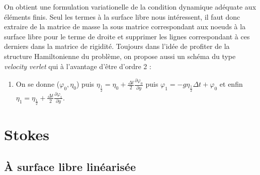 \documentclass{article}
\theoremstyle{plain}
\numberwithin{equation}{section} %
\begin{document}
On obtient une formulation variationelle de la condition dynamique ad\'equate aux \'el\'ements finis. Seul les termes \`a la surface libre nous int\'eressent, il faut donc extraire de la matrice de masse la sous matrice correspondant aux noeuds \`a la surface libre pour le terme de droite et supprimer les lignes correspondant \`a ces derniers dans la matrice de rigidit\'e. Toujours dans l'id\'ee de profiter de la structure Hamiltonienne du probl\`eme, on propose aussi un sch\'ema du type \textit{velocity verlet} qui \`a l'avantage d'\^etre d'ordre 2 : 
 
\begin{enumerate}[resume]
	\item On se donne ($\varphi_0,\eta_0$) puis $\eta_{\frac{1}{2}}=\eta_0+\frac{\Delta t}{2} \frac{\partial \varphi_0}{\partial y}$ puis $\varphi_1=-g \eta_{\frac{1}{2}} \Delta t +\varphi_0$ et enfin $\eta_{1}=\eta_{\frac{1}{2}}+\frac{\Delta t}{2} \frac{\partial \varphi_1}{\partial y}$.
\end{enumerate}


\section{Stokes}
\subsection{\`A surface libre lin\'earis\'ee}
\end{document}
